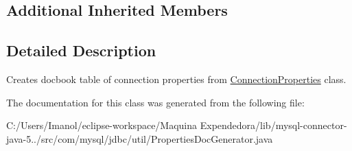 \subsection*{Additional Inherited Members}


\subsection{Detailed Description}
Creates docbook table of connection properties from \mbox{\hyperlink{interfacecom_1_1mysql_1_1jdbc_1_1_connection_properties}{Connection\+Properties}} class. 

The documentation for this class was generated from the following file\+:\begin{DoxyCompactItemize}
\item 
C\+:/\+Users/\+Imanol/eclipse-\/workspace/\+Maquina Expendedora/lib/mysql-\/connector-\/java-\/5../src/com/mysql/jdbc/util/Properties\+Doc\+Generator.\+java\end{DoxyCompactItemize}
